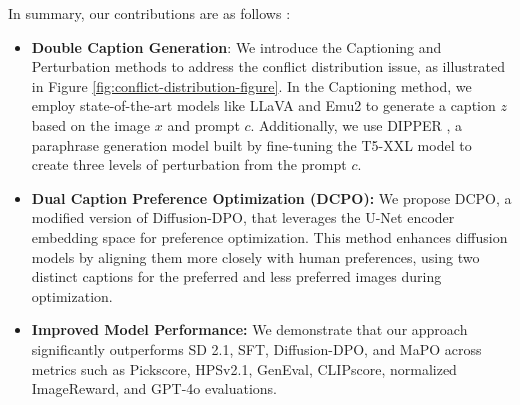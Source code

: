 
In summary, our contributions are as follows : 


\begin{itemize}

    \item \textbf{Double Caption Generation}: We introduce the Captioning and Perturbation methods to address the conflict distribution issue, as illustrated in Figure \ref{fig:conflict-distribution-figure}. In the Captioning method, we employ state-of-the-art models like LLaVA \citep{liu2024visual} and Emu2 \citep{sun2024generative} to generate a caption \( z \) based on the image \( x \) and prompt \( c \). Additionally, we use DIPPER \citep{dipper}, a paraphrase generation model built by fine-tuning the T5-XXL model to create three levels of perturbation from the prompt \( c \).
    
    \item \textbf{Dual Caption Preference Optimization (DCPO):} We propose DCPO, a modified version of Diffusion-DPO, that leverages the U-Net encoder embedding space for preference optimization. This method enhances diffusion models by aligning them more closely with human preferences, using two distinct captions for the preferred and less preferred images during optimization.
    
    \item \textbf{Improved Model Performance:} We demonstrate that our approach significantly outperforms SD 2.1, SFT, Diffusion-DPO, and MaPO across metrics such as Pickscore, HPSv2.1, GenEval, CLIPscore, normalized ImageReward, and GPT-4o \citep{achiam2023gpt} evaluations.
    
\end{itemize}






